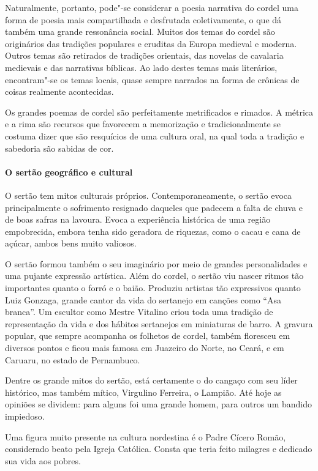 \documentclass[11pt]{extarticle}
\begin{document}
Naturalmente, portanto, pode"-se considerar a poesia narrativa do cordel uma
forma de poesia mais compartilhada e desfrutada coletivamente, o que dá também
uma grande ressonância social. Muitos dos temas do cordel são originários das
tradições populares e eruditas da Europa medieval e moderna. Outros temas são
retirados de tradições orientais, das novelas de cavalaria medievais e das narrativas
bíblicas. Ao lado destes temas mais literários, encontram"-se os temas locais,
quase sempre narrados na forma de crônicas de coisas realmente acontecidas.

Os grandes poemas de cordel são perfeitamente metrificados e rimados. A métrica
e a rima são recursos que favorecem a memorização e tradicionalmente se costuma
dizer que são resquícios de uma cultura oral, na qual toda a tradição e
sabedoria são sabidas de cor.  


\paragraph{O sertão geográfico e cultural}

O sertão tem mitos culturais próprios. Contemporaneamente, o sertão evoca
principalmente o sofrimento resignado daqueles que padecem a falta de chuva e
de boas safras na lavoura. Evoca a experiência histórica de uma região
empobrecida, embora tenha sido geradora de riquezas, como o cacau e cana de
açúcar, ambos bens muito valiosos. 

O sertão formou também o seu imaginário por meio de grandes personalidades e
uma pujante expressão artística. Além do cordel, o sertão viu nascer ritmos tão
importantes quanto o forró e o baião. Produziu artistas tão expressivos quanto
Luiz Gonzaga, grande cantor da vida do sertanejo em canções como “Asa branca”.
Um escultor como Mestre Vitalino criou toda uma tradição de representação da
vida e dos hábitos sertanejos em miniaturas de barro. A gravura popular, que
sempre acompanha os folhetos de cordel, também floresceu em diversos pontos e
ficou mais famosa em Juazeiro do Norte, no Ceará, e em Caruaru, no estado de
Pernambuco. 

Dentre os grande mitos do sertão, está certamente o do cangaço com seu líder
histórico, mas também mítico, Virgulino Ferreira, o Lampião. Até hoje as
opiniões se dividem: para alguns foi uma grande homem, para outros um bandido
impiedoso. 

Uma figura muito presente na cultura nordestina é o Padre Cícero Romão,
considerado beato pela Igreja Católica. Consta que teria feito milagres e
dedicado sua vida aos pobres. 
\end{document}
